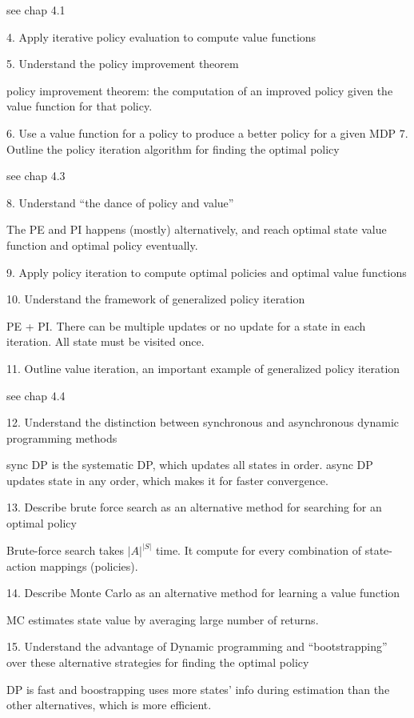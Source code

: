 \documentclass[sutton_barto_notes.tex]{subfiles}
\begin{document}
see chap 4.1

4. Apply iterative policy evaluation to compute value functions

5. Understand the policy improvement theorem

policy improvement theorem: the computation of an improved policy given the value function for that policy.

6. Use a value function for a policy to produce a better policy for a given MDP
7. Outline the policy iteration algorithm for finding the optimal policy

see chap 4.3

8. Understand “the dance of policy and value”

The PE and PI happens (mostly) alternatively, and reach optimal state value function and optimal policy eventually.

9. Apply policy iteration to compute optimal policies and optimal value functions

10. Understand the framework of generalized policy iteration

PE + PI. There can be multiple updates or no update for a state in each iteration. All state must be visited once.

11. Outline value iteration, an important example of generalized policy iteration

see chap 4.4

12. Understand the distinction between synchronous and asynchronous dynamic programming methods

sync DP is the systematic DP, which updates all states in order. async DP updates state in any order, which makes it for faster convergence.

13. Describe brute force search as an alternative method for searching for an optimal policy

Brute-force search takes $|A|^{|S|}$ time. It compute for every combination of state-action mappings (policies).

14. Describe Monte Carlo as an alternative method for learning a value function

MC estimates state value by averaging large number of returns.

15. Understand the advantage of Dynamic programming and “bootstrapping” over these alternative strategies for finding the optimal policy

DP is fast and boostrapping uses more states' info during estimation than the other alternatives, which is more efficient.
\end{document}
